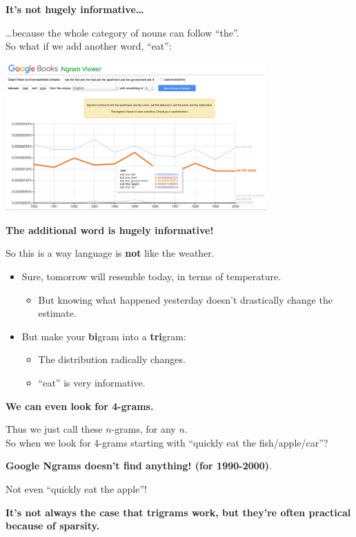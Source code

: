 \documentclass{beamer}
\newcommand{\pagestepalt}[2]{
  \begin{frame}[t]
    \begin{minipage}[t][0.26\textheight][t]{\textwidth}
      \begin{center}
        \huge
        \textbf{#1}
      \end{center}
    \end{minipage}
    
    \begin{minipage}[t][0.7\textheight][c]{\textwidth}
      #2
    \end{minipage}
  \end{frame}
}
\begin{document}
\pagestepalt{It's not hugely informative\ldots}{
  \ldots because the whole category of nouns can follow ``the''.\\ \pause
  So what if we add another word, ``eat'':
  \begin{center}
    \includegraphics[width=0.75\textwidth]{../images/eat.png}
  \end{center}
}

\pagestepalt{The additional word is hugely informative!}{
  So this is a way language is \textbf{not} like the weather.\pause
  \begin{itemize}
  \item Sure, tomorrow will resemble today, in terms of temperature.
    \begin{itemize}
    \item But knowing what happened yesterday  doesn't drastically
      change the estimate.
    \end{itemize}\pause
  \item But make your \alert{{\bf bi}gram} into a \alert{{\bf tri}gram}:
    \begin{itemize}
    \item The distribution radically changes.
    \item ``eat'' is very informative.
    \end{itemize}
  \end{itemize}
}

\pagestepalt{We can even look for \alert{4-grams}.}{
  Thus we just call these \alert{$n$-grams}, for any $n$. \\
  So when we look for 4-grams starting with ``quickly eat the fish/apple/car''? \pause
  \begin{center}
    \large\textbf{Google Ngrams doesn't find anything! (for 1990-2000)}.
  \end{center}\pause
  Not even ``quickly eat the apple''!\pause
  \begin{center}
    \textbf{It's not always the case that trigrams work, but they're often practical because of \alert{sparsity}.}
  \end{center}
  
}
\end{document}
